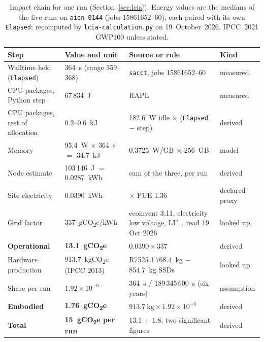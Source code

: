 \documentclass[conference,a4paper]{IEEEtran}
\begin{document}
\begin{table}[!t]
\caption{Impact chain for one run (Section~\ref{sec:lcia}). Energy values are
the medians of the five runs on \texttt{aion-0144} (jobs 15861652--60), each
paired with its own \texttt{Elapsed}; recomputed by
\texttt{lcia-calculation.py} on 19~October~2026. IPCC~2021 GWP100 unless
stated.}
\label{tab:chain}
\centering\footnotesize\setlength{\tabcolsep}{4pt}
\begin{tabular}{@{}llll@{}}
\toprule
Step & Value and unit & Source or rule & Kind \\
\midrule
Walltime held (\texttt{Elapsed}) & 364~s (range 359--368) & \texttt{sacct}, jobs 15861652--60 & measured \\
CPU packages, Python step & 67\,834~J & RAPL & measured \\
CPU packages, rest of allocation & 0.2--0.6~kJ & 182.6~W idle $\times$ (\texttt{Elapsed} $-$ step) & derived \\
Memory & 95.4~W $\times$ 364~s $=$ 34.7~kJ & 0.3725~W/GB $\times$ 256~GB~\cite{lannelongue2021} & model \\
Node estimate & 103\,146~J $=$ 0.0287~kWh & sum of the three, per run & derived \\
Site electricity & 0.0390~kWh & $\times$ PUE 1.36~\cite{eudc2025} & declared proxy \\
Grid factor & 337~gCO\textsubscript{2}e/kWh & ecoinvent 3.11, electricity low voltage, LU~\cite{ecoinventlu}, read 19 Oct 2026 & looked up \\
\textbf{Operational} & \textbf{13.1~gCO\textsubscript{2}e} & $0.0390 \times 337$ & derived \\
Hardware production & 913.7~kgCO\textsubscript{2}e (IPCC 2013) & R7525 1\,768.4~kg $-$ 854.7~kg SSDs~\cite{dellr7525} & looked up \\
Share per run & $1.92\times10^{-6}$ & 364~s / 189\,345\,600~s (six years) & assumption \\
\textbf{Embodied} & \textbf{1.76~gCO\textsubscript{2}e} & $913.7~\text{kg} \times 1.92\times10^{-6}$ & derived \\
\textbf{Total} & \textbf{15~gCO\textsubscript{2}e per run} & 13.1 $+$ 1.8, two significant figures & derived \\
\bottomrule
\end{tabular}
\end{table}
\end{document}
